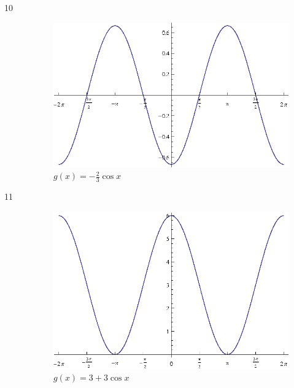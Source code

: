 \documentclass{exam}
\begin{document}
\begin{description}
      \item[10]
        \begin{figure}[H]
          \centering
          \includegraphics[scale=0.9]{exercise10.eps}
          \caption{$g(x) = - \frac{2}{3} \cos x$}
        \end{figure}

      \item[11]
        \begin{figure}[H]
          \centering
          \includegraphics[scale=0.9]{exercise11.eps}
          \caption{$g(x) = 3 + 3 \cos x$}
        \end{figure}


\end{description}
\end{document}

